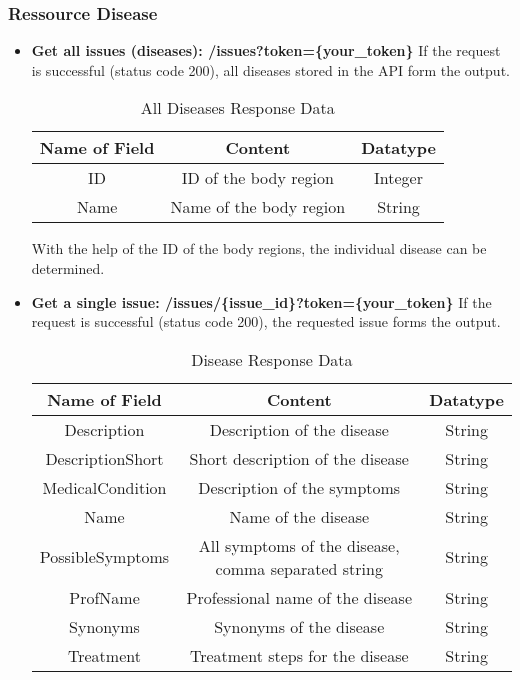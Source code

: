 \subsubsection{Ressource Disease}
\begin{itemize}
	\item \textbf{Get all issues (diseases):  /issues?token=\{your\_token\}}
	\newline
	If the request is successful (status code 200), all diseases stored in the API form the output.
	\begin{table}[H]
		\centering
		\begin{tabular}{ | c| c| c | } 
			\hline
			Name of Field& Content & Datatype \\ 
			\hline
			ID & ID of the body region & Integer \\ 
			\hline
			Name & Name of the body region & String \\ 
			\hline
		\end{tabular}
		\caption{All Diseases Response Data}
	\end{table}
	With the help of the ID of the body regions, the individual disease can be determined.
	\item \textbf{Get a single issue:  /issues/\{issue\_id\}?token=\{your\_token\}}
	\newline
	If the request is successful (status code 200), the requested issue forms the output.
	\begin{table}[H]
		\centering
		\begin{tabular}{ | c| c| c | } 
			\hline
			Name of Field& Content & Datatype \\ 
			\hline
			Description & Description of the disease & String \\ 
			\hline
			DescriptionShort & Short description of the disease & String \\ 
			\hline
			MedicalCondition & Description of the symptoms & String \\ 
			\hline
			Name & Name of the disease & String \\ 
			\hline
			PossibleSymptoms & All symptoms of the disease, comma separated string & String \\ 
			\hline
			ProfName & Professional name of the disease & String \\ 
			\hline
			Synonyms & Synonyms of the disease & String \\ 
			\hline
			Treatment & Treatment steps for the disease & String \\
			\hline 
		\end{tabular}
	 \caption{Disease Response Data}
	\end{table}
\end{itemize}
